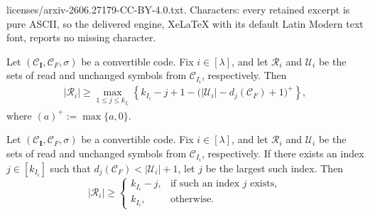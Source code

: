 \documentclass[10pt,a4paper]{amsart}
\newcommand{\mC}{\mathcal{C}}
\newcommand{\mR}{\mathcal{R}}
\newcommand{\mU}{\mathcal{U}}
\begin{document}
licenses/arxiv-2606.27179-CC-BY-4.0.txt. Characters: every retained excerpt is pure ASCII, so the delivered engine, XeLaTeX with its default Latin Modern text font, reports no missing character.
\begin{proposition}\label{prop:readlower}
Let $(\mC_{\textbf{I}},\mC_F,\sigma)$ be a convertible code. Fix $i\in [\lambda]$, and let $\mR_i$ and $\mU_i$ be the sets of read and unchanged symbols from $\mC_{I_i}$, respectively. Then
\begin{align*} |\mR_i|\ge \max_{1\le j\le k_{I_i}}\left\{ k_{I_i}-j+1-\bigl(|\mU_i|-d_j(\mC_F)+1\bigr)^+ \right\}, \end{align*}
where $(a)^+:=\max\{a,0\}$.
\end{proposition}

\begin{theorem}\label{thm:readlowergen}

Let $(\mC_{\mathbf I},\mC_F,\sigma)$ be a convertible code. Fix $i\in[\lambda]$, and let $\mR_i$ and $\mU_i$ be the sets of read and unchanged symbols from $\mC_{I_i}$, respectively. If there exists an index $j\in[k_{I_i}]$ such that $d_j(\mC_F)<|\mU_i|+1$, let $j$ be the largest such index. Then \[ |\mR_i| \geq \begin{cases} k_{I_i}-j, & \text{if such an index } j \text{ exists},\\ k_{I_i}, & \text{otherwise}. \end{cases} \]
\end{theorem}
\end{document}
